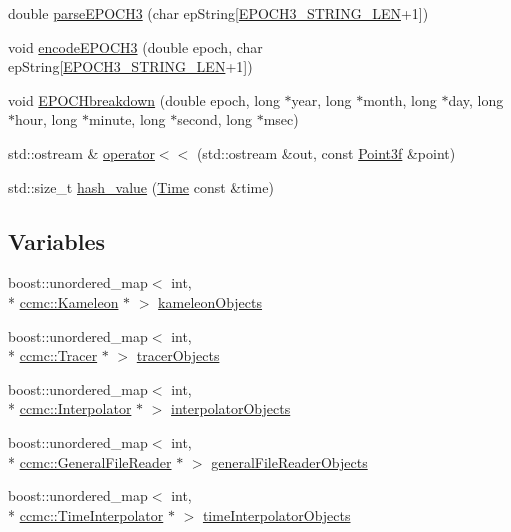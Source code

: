 \begin{DoxyCompactItemize}
double \hyperlink{namespaceccmc_a17625a00cb5c6d62f957839dcfabf7dd}{parse\-E\-P\-O\-C\-H3} (char ep\-String\mbox{[}\hyperlink{_kameleon_8h_a6f9c7e3353c7eb6333adaa96be43edab}{E\-P\-O\-C\-H3\-\_\-\-S\-T\-R\-I\-N\-G\-\_\-\-L\-E\-N}+1\mbox{]})
\item 
void \hyperlink{namespaceccmc_a07dfb0ccd6e3ff58181ad54f151e1c3a}{encode\-E\-P\-O\-C\-H3} (double epoch, char ep\-String\mbox{[}\hyperlink{_kameleon_8h_a6f9c7e3353c7eb6333adaa96be43edab}{E\-P\-O\-C\-H3\-\_\-\-S\-T\-R\-I\-N\-G\-\_\-\-L\-E\-N}+1\mbox{]})
\item 
void \hyperlink{namespaceccmc_a865f02361d01e00b2280b3b729bf6a34}{E\-P\-O\-C\-Hbreakdown} (double epoch, long $\ast$year, long $\ast$month, long $\ast$day, long $\ast$hour, long $\ast$minute, long $\ast$second, long $\ast$msec)
\item 
std\-::ostream \& \hyperlink{namespaceccmc_a447a43508de96a63d12aae7c85aaa06b}{operator$<$$<$} (std\-::ostream \&out, const \hyperlink{classccmc_1_1_point3f}{Point3f} \&point)
\item 
std\-::size\-\_\-t \hyperlink{namespaceccmc_a12a62484d27726b55814a116018d6434}{hash\-\_\-value} (\hyperlink{classccmc_1_1_time}{Time} const \&time)
\end{DoxyCompactItemize}
\subsection*{Variables}
\begin{DoxyCompactItemize}
\item 
boost\-::unordered\-\_\-map$<$ int, \\*
\hyperlink{classccmc_1_1_kameleon}{ccmc\-::\-Kameleon} $\ast$ $>$ \hyperlink{namespaceccmc_a32accee4a9d6e98c351ba973d5153bf0}{kameleon\-Objects}
\item 
boost\-::unordered\-\_\-map$<$ int, \\*
\hyperlink{classccmc_1_1_tracer}{ccmc\-::\-Tracer} $\ast$ $>$ \hyperlink{namespaceccmc_ab28d1a1a0dab8213d6468d0138d9d845}{tracer\-Objects}
\item 
boost\-::unordered\-\_\-map$<$ int, \\*
\hyperlink{classccmc_1_1_interpolator}{ccmc\-::\-Interpolator} $\ast$ $>$ \hyperlink{namespaceccmc_a2c048d6e94d27b4ed2512ee7b3120cee}{interpolator\-Objects}
\item 
boost\-::unordered\-\_\-map$<$ int, \\*
\hyperlink{classccmc_1_1_general_file_reader}{ccmc\-::\-General\-File\-Reader} $\ast$ $>$ \hyperlink{namespaceccmc_a7ba79d1acce93baeda374a43851156aa}{general\-File\-Reader\-Objects}
\item 
boost\-::unordered\-\_\-map$<$ int, \\*
\hyperlink{classccmc_1_1_time_interpolator}{ccmc\-::\-Time\-Interpolator} $\ast$ $>$ \hyperlink{namespaceccmc_a1d8863c8e4bddace1d180833373be257}{time\-Interpolator\-Objects}
\end{DoxyCompactItemize}


